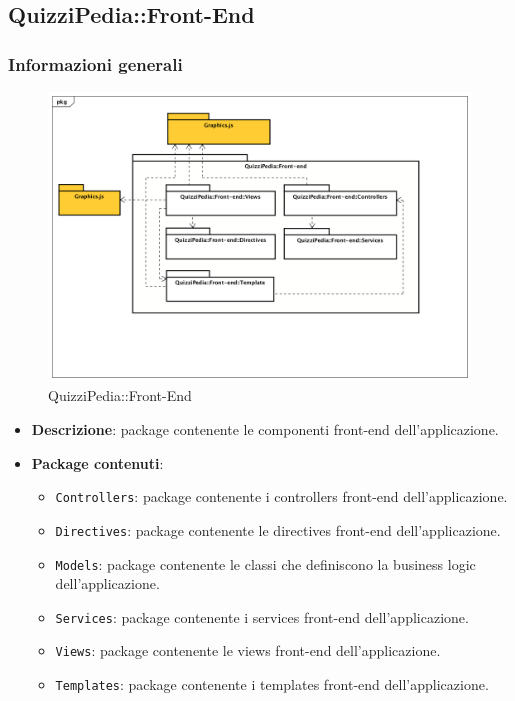 \subsection{QuizziPedia::Front-End}
\subsubsection{Informazioni generali}
\label{QuizziPedia::Front-End}
\begin{figure}
	\centering
	\includegraphics[scale=0.45]{UML/Package/QuizziPedia_Front-end.png}
	\caption{QuizziPedia::Front-End}
\end{figure}

	\begin{itemize}
		\item \textbf{Descrizione}: package contenente le componenti front-end dell'applicazione.
		\item \textbf{Package contenuti}:
		\begin{itemize}
			\item \texttt{Controllers}: package contenente i controllers front-end dell'applicazione.
			\item \texttt{Directives}: package contenente le directives front-end dell'applicazione.
			\item \texttt{Models}: package contenente le classi che definiscono la business logic dell'applicazione.
			\item \texttt{Services}: package contenente i services front-end dell'applicazione.
			\item \texttt{Views}: package contenente le views front-end dell'applicazione.
			\item \texttt{Templates}: package contenente i templates front-end dell'applicazione.
		\end{itemize}
	\end{itemize}
	
